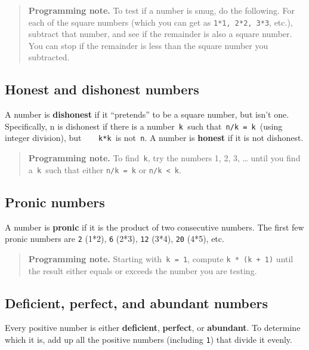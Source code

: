 \documentclass[12pt,a4paper,times]{article}
\begin{document}
\begin{quote}
\textbf{Programming note.} To test if a number is smug, do the
following. For each of the square numbers (which you can get as
\texttt{1*1,\ 2*2,\ 3*3}, etc.), subtract that number, and see if the
remainder is also a square number. You can stop if the remainder is less
than the square number you subtracted.
\end{quote}

\subsection{Honest and dishonest
numbers}\label{honest-and-dishonest-numbers}

A number is \textbf{dishonest} if it ``pretends'' to be a square number,
but isn't one. Specifically, n is dishonest if there is a
number\texttt{\ k\ }such that\texttt{\ n/k~=~k\ }(using integer
division), but\texttt{\ \ \ \ k*k\ }is not\texttt{\ n}. A number is
\textbf{honest} if it is not dishonest.

\begin{quote}
\textbf{Programming note.} To find\texttt{\ k}, try the numbers 1, 2, 3,
\ldots{} until you find a\texttt{\ k\ }such that either \texttt{n/k~=~k}
or \texttt{n/k~\textless{}~k}.
\end{quote}

\subsection{Pronic numbers}\label{pronic-numbers}

A number is \textbf{pronic} if it is the product of two consecutive
numbers. The first few pronic numbers are \texttt{2} (1*2), \texttt{6}
(2*3), \texttt{12} (3*4), \texttt{20} (4*5), etc.

\begin{quote}
\textbf{Programming note.} Starting with\texttt{\ k\ =\ 1}, compute
\texttt{k\ *\ (k\ +\ 1)} until the result either equals or exceeds the
number you are testing.
\end{quote}

\subsection{Deficient, perfect, and abundant
numbers}\label{deficient-perfect-and-abundant-numbers}

Every positive number is either \textbf{deficient}, \textbf{perfect}, or
\textbf{abundant}. To determine which it is, add up all the positive
numbers (including \texttt{1}) that divide it evenly.
\end{document}
